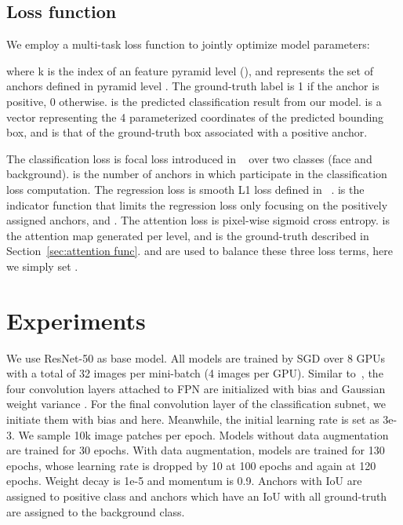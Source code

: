 \documentclass[10pt,twocolumn,letterpaper]{article}
\begin{document}
\subsection{Loss function}\label{sec:training}





We employ a multi-task loss function to jointly optimize model parameters:

where k is the index of an feature pyramid level (), and  represents the set of anchors defined in pyramid level . The ground-truth label  is 1 if the anchor is positive, 0 otherwise.  is the predicted classification result from our model.  is a vector representing the 4 parameterized coordinates of the predicted bounding box, and  is that of the ground-truth box associated with a positive anchor. 

The classification loss  is focal loss introduced in ~\cite{lin2017focal} over two classes (face and background).  is the number of anchors in  which participate in the classification loss computation. The regression loss  is smooth L1 loss defined in ~\cite{girshick2015fast}.  is the indicator function that limits the regression loss only focusing on the positively assigned anchors, and . The attention loss  is pixel-wise sigmoid cross entropy.  is the attention map generated per level, and  is the ground-truth described in Section~\ref{sec:attention func}. and  are used to balance these three loss terms, here we simply set .






\section{Experiments}
We use ResNet-50 as base model. All models are trained by SGD over 8 GPUs with a total of 32 images per mini-batch (4 images per GPU). Similar to~\cite{lin2017focal}, the four convolution layers attached to FPN are initialized with bias  and Gaussian weight variance . For the final convolution layer of the classification subnet, we initiate them with bias  and  here. Meanwhile, the initial learning rate is set as 3e-3. We sample 10k image patches per epoch. Models without data augmentation are trained for 30 epochs. With data augmentation, models are trained for 130 epochs, whose learning rate is dropped by 10 at 100 epochs and again at 120 epochs. Weight decay is 1e-5 and momentum is 0.9. Anchors with IoU  are assigned to positive class and anchors which have an IoU  with all ground-truth are assigned to the background class.
\end{document}
